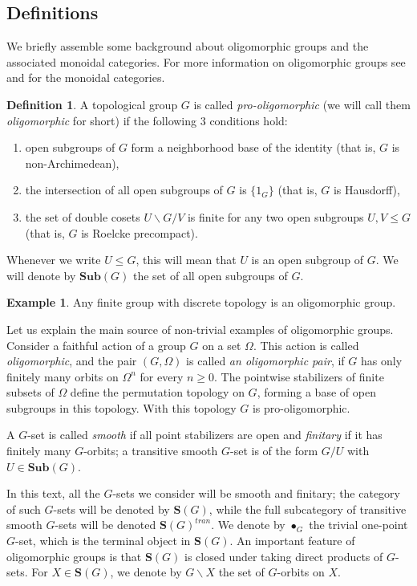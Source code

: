 \documentclass[11pt,a4paper]{amsart}
\theoremstyle{plain}%
\theoremstyle{definition}
\newtheorem{definition}[lemma]{Definition}
\newtheorem{example}[lemma]{Example}
\theoremstyle{remark}
\newcommand{\Sub}{\mathbf{Sub}}
\begin{document}
\subsection{Definitions}\label{ssec:olig_defs}
We briefly assemble some background about oligomorphic groups and the associated monoidal categories. For more information on oligomorphic groups see \cite{Cameron-book} and \cite[Definitions 2.1 and 2.3 and Proposition 2.4]{HS-oligomorphic} for the monoidal categories.
\begin{definition}
    

A topological group $G$ is called \emph{pro-oligomorphic} (we will call them \emph{oligomorphic} for short) if the following $3$ conditions {hold}: 
\begin{enumerate}
    \item open subgroups of $G$ form a neighborhood base of the identity (that is, $G$ is non-Archimedean),
    \item the intersection of all open subgroups of $G$ is $\{1_G\}$ (that is, $G$ is Hausdorff),
    \item the set of double cosets $U\backslash G/V$ is finite for any two open subgroups $U,V\leq G$ (that is, $G$ is Roelcke precompact).
\end{enumerate}
\end{definition}
Whenever we write $U\leq G$, this will mean that $U$ is an open subgroup of $G$. We will denote by $\Sub(G)$ the set of all open subgroups of $G$.
\begin{example}
    Any finite group with discrete topology is an oligomorphic group.
\end{example}

Let us explain the main source of non-trivial examples of oligomorphic groups.
Consider a faithful action of a group $G$ on a set $\Omega$. This action is called \emph{oligomorphic}, and the pair $(G, \Omega)$ is called \emph{an oligomorphic pair}, if $G$ has only finitely many orbits on $\Omega^n$ for every $n\geq0$. The pointwise stabilizers of finite subsets of $\Omega$ define the permutation topology on $G$, forming a base of open subgroups in this topology. With this topology $G$ is pro-oligomorphic. 

A $G$-set is called \emph{smooth} if all point stabilizers are open and \emph{finitary} if it has finitely many $G$-orbits; a transitive smooth $G$-set is of the form $G/U$ with $U\in \Sub(G)$.

In this text, all the $G$-sets we consider will be smooth and finitary; the category of such $G$-sets will be {denoted} by $\mathbf{S}(G)$, while the full subcategory of transitive smooth $G$-sets will be {denoted} $\mathbf{S}(G)^{tran}$. We denote by $\bullet_G$ the trivial one-point $G$-set, which is the terminal object in $\mathbf{S}(G)$. An important feature of oligomorphic groups is that $\mathbf{S}(G)$ is closed under taking direct products of $G$-sets. For $X\in \mathbf{S}(G)$, we denote by $G\backslash X$ the set of $G$-orbits on $X$.
\end{document}
